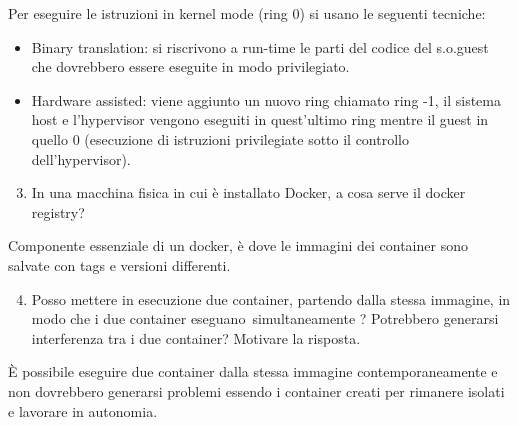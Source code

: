 \documentclass[
]{article}
\providecommand{\tightlist}{%
  \setlength{\itemsep}{0pt}\setlength{\parskip}{0pt}}
\begin{document}
{}

{Per eseguire le istruzioni in kernel mode (ring 0) si usano le seguenti
tecniche:}

\begin{itemize}
\tightlist
\item
  {Binary translation}{: si riscrivono a run-time le parti del codice
  del s.o.guest che dovrebbero essere eseguite in modo privilegiato.}
\end{itemize}

{}

\begin{itemize}
\tightlist
\item
  {Hardware assisted}{: viene aggiunto un nuovo ring chiamato }{ring
  -1}{, il sistema host e l'hypervisor vengono eseguiti in quest'ultimo
  ring mentre il guest in quello 0 (esecuzione di istruzioni
  privilegiate sotto il controllo dell'hypervisor).}
\end{itemize}

{}

{}

{}

\begin{enumerate}
\setcounter{enumi}{2}
\tightlist
\item
  {In una macchina fisica in cui è installato Docker, a cosa serve il
  docker registry?}
\end{enumerate}

{}

{Componente essenziale di un docker, è dove le immagini dei container
sono salvate con tags e versioni differenti.}

{}

{}

\begin{enumerate}
\setcounter{enumi}{3}
\tightlist
\item
  {Posso mettere in esecuzione due container, partendo dalla stessa
  immagine, in modo che i due container }{eseguano}{~simultaneamente ?
  Potrebbero generarsi interferenza tra i due container? Motivare la
  risposta. }
\end{enumerate}

{}

{È possibile eseguire due container dalla stessa immagine
contemporaneamente e non dovrebbero generarsi problemi essendo i
container creati per rimanere isolati e lavorare in autonomia.}

{~~~~~~~~}

{}
\end{document}
